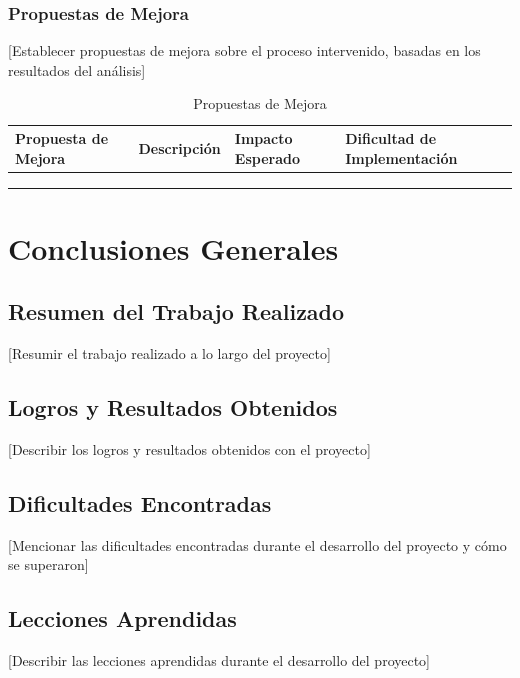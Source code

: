 \documentclass[12pt,letterpaper]{report}
\begin{document}
\subsection{Propuestas de Mejora}
[Establecer propuestas de mejora sobre el proceso intervenido, basadas en los resultados del análisis]

\begin{table}[H]
    \centering
    \begin{tabularx}{\textwidth}{|X|X|X|X|}
        \hline
        \textbf{Propuesta de Mejora} & \textbf{Descripción} & \textbf{Impacto Esperado} & \textbf{Dificultad de Implementación} \\
        \hline
        & & & \\
        \hline
        & & & \\
        \hline
        & & & \\
        \hline
    \end{tabularx}
    \caption{Propuestas de Mejora}
\end{table}

\chapter{Conclusiones Generales}

\section{Resumen del Trabajo Realizado}
[Resumir el trabajo realizado a lo largo del proyecto]

\section{Logros y Resultados Obtenidos}
[Describir los logros y resultados obtenidos con el proyecto]

\section{Dificultades Encontradas}
[Mencionar las dificultades encontradas durante el desarrollo del proyecto y cómo se superaron]

\section{Lecciones Aprendidas}
[Describir las lecciones aprendidas durante el desarrollo del proyecto]
\end{document}
